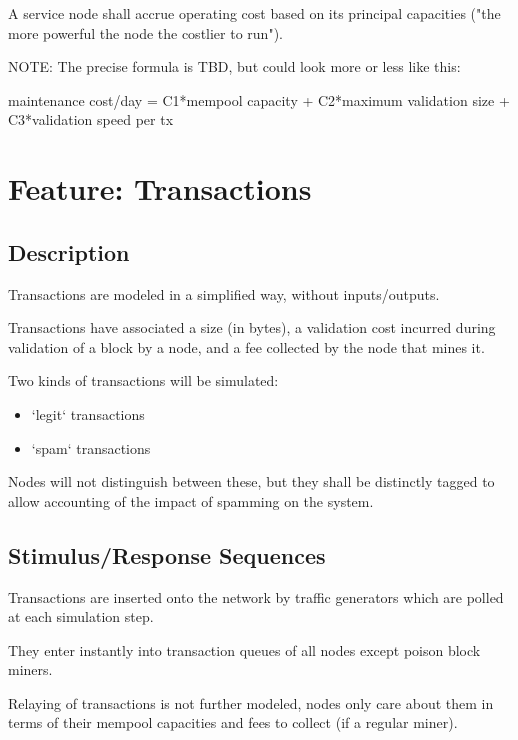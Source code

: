 \documentclass{scrreprt}
\begin{document}
        A service node shall accrue operating cost based on its principal
        capacities ("the more powerful the node the costlier to run").

        NOTE: The precise formula is TBD, but could look more or less like
        this:

        maintenance cost/day = C1*mempool capacity + C2*maximum validation size
        + C3*validation speed per tx

  \section{Feature: Transactions}

    \subsection{Description}

      Transactions are modeled in a simplified way, without inputs/outputs.

      Transactions have associated a size (in bytes), a validation cost
      incurred during validation of a block by a node, and a fee collected
      by the node that mines it.

      Two kinds of transactions will be simulated:

      \begin{itemize}
        \item `legit` transactions
        \item `spam` transactions
      \end{itemize}

      Nodes will not distinguish between these, but they shall be distinctly
      tagged to allow accounting of the impact of spamming on the system.

    \subsection{Stimulus/Response Sequences}

      Transactions are inserted onto the network by traffic generators which
      are polled at each simulation step.

      They enter instantly into transaction queues of all nodes except poison
      block miners.

      Relaying of transactions is not further modeled, nodes only care about
      them in terms of their mempool capacities and fees to collect
      (if a regular miner).
\end{document}
